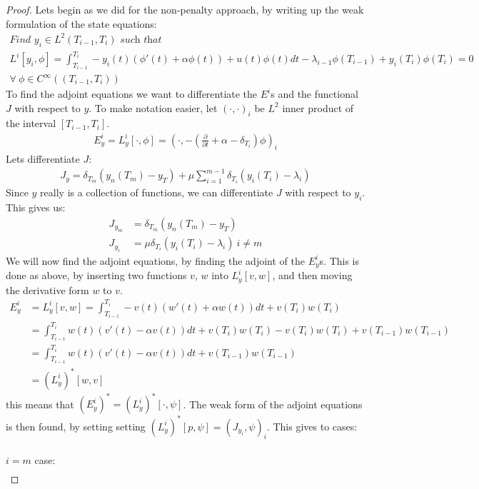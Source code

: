 \documentclass[11pt,a4paper]{article}
\begin{document}
\begin{proof}
Lets begin as we did for the non-penalty approach, by writing up the weak formulation of the state equations:
\begin{gather*}
\textit{Find $y_i \in L^2(T_{i-1},T_i)$ such that }\\
L^i[y_i,\phi] = \int_{T_{i-1}}^{T_{i}}-y_i(t)(\phi'(t) +\alpha \phi(t))+u(t)\phi(t)dt -\lambda_{i-1}\phi(T_{i-1})+ y_i(T_i)\phi(T_i) =0\\ \forall \ \phi \in C^{\infty}((T_{i-1},T_{i}))
\end{gather*} 
To find the adjoint equations we want to differentiate the $E^i$s and the functional $J$ with respect to $y$. To make notation easier, let $(\cdot,\cdot)_i$ be $L^2$ inner product of the interval $[T_{i-1},T_i]$. 
\begin{align*}
E_y^i=L_y^i[\cdot,\phi]=(\cdot,-(\frac{\partial}{\partial t} + \alpha - \delta_{T_i})\phi)_i 
\end{align*}
Lets differentiate $J$:
\begin{align*}
J_y = \delta_{T_{m}}(y_n(T_{m})-y_T) + \mu \sum_{i=1}^{m-1} \delta_{T_{i}}(y_{i}(T_i)-\lambda_i ) 
\end{align*}
Since $y$ really is a collection of functions, we can differentiate $J$ with respect to $y_i$. This gives us:
\begin{align*}
J_{y_m} &= \delta_{T_{m}}(y_n(T_{m})-y_T) \\
J_{y_i} &= \mu\delta_{T_{i}}(y_{i}(T_i)-\lambda_i ) \ i\neq m
\end{align*}
We will now find the adjoint equations, by finding the adjoint of the $E_y^i$s. This is done as above, by inserting two functions $v$, $w$ into $L_y^i[v,w]$, and then moving the derivative form $w$ to $v$.
\begin{align*}
E_y^i&=L_y^i[v,w]=\int_{T_{i-1}}^{T_i}-v(t)(w'(t)+\alpha w(t))dt + v(T_i)w(T_i) \\
&=\int_{T_{i-1}}^{T_i}w(t)(v'(t)-\alpha v(t))dt + v(T_i)w(T_i)-v(T_i)w(T_i) +v(T_{i-1})w(T_{i-1}) \\
&=\int_{T_{i-1}}^{T_i}w(t)(v'(t)-\alpha v(t))dt + v(T_{i-1})w(T_{i-1}) \\
&=(L_y^i)^*[w,v]
\end{align*}
this means that $(E_y^i)^*=(L_y^i)^*[\cdot,\psi]$. The weak form of the adjoint equations is then found, by setting setting $(L_y^i)^*[p,\psi]=(J_{y_i},\psi)_i$. This gives to cases:
\\
\\
$i=m$ case:
\begin{align*}

\end{align*}
\end{proof}
\end{document}
